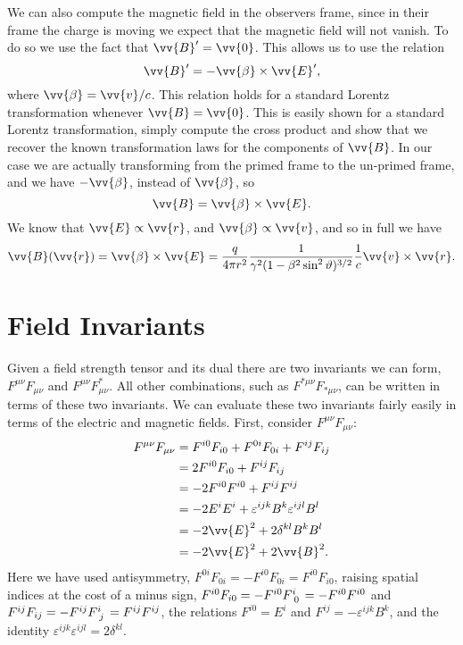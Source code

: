 We can also compute the magnetic field in the observers frame, since in their frame the charge is moving we expect that the magnetic field will not vanish.
To do so we use the fact that \(\vv{B}' = \vv{0}\).
This allows us to use the relation
\begin{equation}
    \vv{B}' = -\vv{\beta} \times \vv{E}',
\end{equation}
where \(\vv{\beta} = \vv{v}/c\).
This relation holds for a standard Lorentz transformation whenever \(\vv{B} = \vv{0}\).
This is easily shown for a standard Lorentz transformation, simply compute the cross product and show that we recover the known transformation laws for the components of \(\vv{B}\).
In our case we are actually transforming from the primed frame to the un-primed frame, and we have \(-\vv{\beta}\), instead of \(\vv{\beta}\), so
\begin{equation}
    \vv{B} = \vv{\beta} \times \vv{E}.
\end{equation}
We know that \(\vv{E} \propto \vv{r}\), and \(\vv{\beta} \propto \vv{v}\), and so in full we have
\begin{equation}
    \vv{B}(\vv{r}) = \vv{\beta} \times \vv{E} = \frac{q}{4\pi r^2} \frac{1}{\gamma^2(1 - \beta^2\sin^2\vartheta)^{3/2}}\frac{1}{c}\vv{v} \times \vv{r}.
\end{equation}

\section{Field Invariants}
Given a field strength tensor and its dual there are two invariants we can form, \(F^{\mu\nu}F_{\mu\nu}\) and \(F^{\mu\nu}F^*_{\mu\nu}\).
All other combinations, such as \(F^{*\mu\nu}F_{*\mu\nu}\), can be written in terms of these two invariants.
We can evaluate these two invariants fairly easily in terms of the electric and magnetic fields.
First, consider \(F^{\mu\nu}F_{\mu\nu}\):
\begin{align}
    F^{\mu\nu}F_{\mu\nu} &= F^{i0}F_{i0} + F^{0i}F_{0i} + F^{ij}F_{ij}\\
    &= 2F^{i0}F_{i0} + F^{ij}F_{ij}\\
    &= -2F^{i0}F^{i0} + F^{ij}F^{ij}\\
    &= -2E^iE^i + \varepsilon^{ijk}B^k\varepsilon^{ijl}B^l\\
    &= -2\vv{E}^2 + 2\delta^{kl}B^kB^l\\
    &= -2\vv{E}^2 + 2\vv{B}^2.
\end{align}
Here we have used antisymmetry, \(F^{0i}F_{0i} = -F^{i0}F_{0i} = F^{i0}F_{i0}\), raising spatial indices at the cost of a minus sign, \(F^{i0}F_{i0} = -F^{i0}\tensor{F}{^i_0} = -F^{i0}F^{i0}\) and \(F^{ij}F_{ij} = -F^{ij}\tensor{F}{^i_j} = F^{ij}F^{ij}\), the relations \(F^{i0} = E^i\) and \(F^{ij} = -\varepsilon^{ijk}B^k\), and the identity \(\varepsilon^{ijk}\varepsilon^{ijl} = 2\delta^{kl}\).

